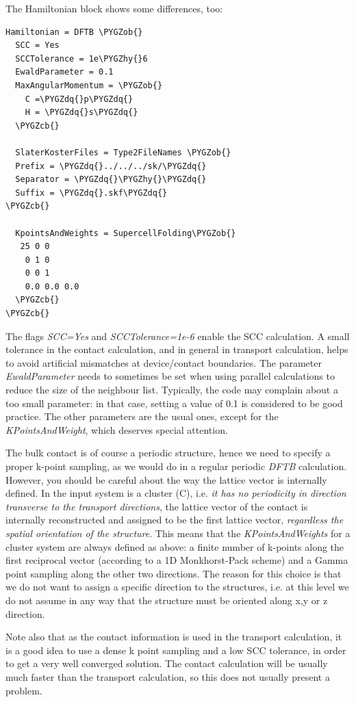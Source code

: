 \documentclass[a4paper,11pt,english]{sphinxmanual}
\def\PYGZob{\char`\{}
\def\PYGZcb{\char`\}}
\def\PYGZhy{\char`\-}
\def\PYGZdq{\char`\"}
\begin{document}
{{The Hamiltonian block shows some differences, too:

\begin{Verbatim}[commandchars=\\\{\}]
Hamiltonian = DFTB \PYGZob{}
  SCC = Yes
  SCCTolerance = 1e\PYGZhy{}6
  EwaldParameter = 0.1
  MaxAngularMomentum = \PYGZob{}
    C =\PYGZdq{}p\PYGZdq{}
    H = \PYGZdq{}s\PYGZdq{}
  \PYGZcb{}

  SlaterKosterFiles = Type2FileNames \PYGZob{}
  Prefix = \PYGZdq{}../../../sk/\PYGZdq{}
  Separator = \PYGZdq{}\PYGZhy{}\PYGZdq{}
  Suffix = \PYGZdq{}.skf\PYGZdq{}
\PYGZcb{}

  KpointsAndWeights = SupercellFolding\PYGZob{}
   25 0 0
    0 1 0
    0 0 1
    0.0 0.0 0.0
  \PYGZcb{}
\PYGZcb{}
\end{Verbatim}

The flags \emph{SCC=Yes} and \emph{SCCTolerance=1e-6} enable the SCC
calculation.  A small tolerance in the contact calculation, and in
general in transport calculation, helps to avoid artificial mismatches
at device/contact boundaries.  The parameter \emph{EwaldParameter} needs to
sometimes be set when using parallel calculations to reduce the size
of the neighbour list. Typically, the code may complain about a too
small parameter: in that case, setting a value of 0.1 is considered to
be good practice. The other parameters are the usual ones, except for
the \emph{KPointsAndWeight}, which deserves special attention.

The bulk contact is of course a periodic structure, hence we need to
specify a proper k-point sampling, as we would do in a regular
periodic \emph{DFTB} calculation. However, you should be careful about the
way the lattice vector is internally defined. In the input system is a
cluster (C), i.e. \emph{it has no periodicity in direction transverse to
the transport directions}, the lattice vector of the contact is
internally reconstructed and assigned to be the first lattice vector,
\emph{regardless the spatial orientation of the structure}. This means that
the \emph{KPointsAndWeights} for a cluster system are always defined as
above: a finite number of k-points along the first reciprocal vector
(according to a 1D Monkhorst-Pack scheme) and a Gamma point sampling
along the other two directions. The reason for this choice is that we
do not want to assign a specific direction to the structures, i.e. at
this level we do not assume in any way that the structure must be
oriented along x,y or z direction.

Note also that as the contact information is used in the transport
calculation, it is a good idea to use a dense k point sampling and a
low SCC tolerance, in order to get a very well converged solution. The
contact calculation will be usually much faster than the transport
calculation, so this does not usually present a problem.

}}
\end{document}
